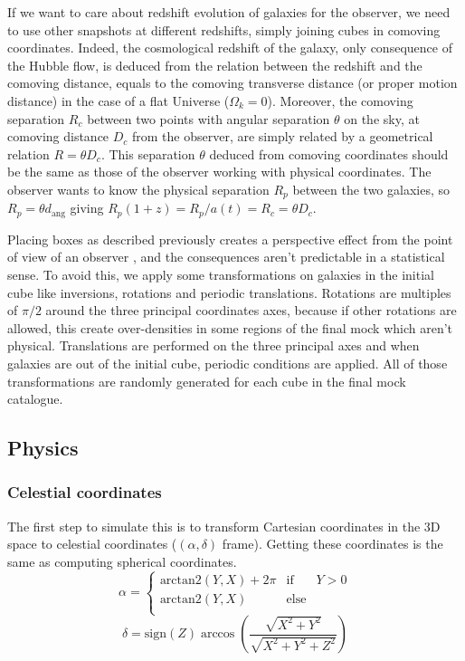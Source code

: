 If we want to care about redshift evolution of galaxies for the observer, we
need to use other snapshots at different redshifts, simply joining cubes in
comoving coordinates. Indeed, the cosmological redshift of the galaxy, only
consequence of the Hubble flow, is deduced from the relation between the
redshift and the comoving distance, equals to the comoving transverse distance
(or proper motion distance) in the case of a flat Universe ($\Omega_k=0$).
Moreover, the comoving separation $R_c$ between two points with angular
separation $\theta$ on the sky, at comoving distance $D_c$ from the observer,
are simply related by a geometrical relation $R=\theta D_c$. This separation
$\theta$ deduced from comoving coordinates should be the same as those of the
observer working with physical coordinates. The observer wants to know the
physical separation $R_p$ between the two galaxies, so $R_p=\theta
d_\mathrm{ang}$ giving $R_p \left(1+z\right)= R_p/a\left(t\right)=R_c=\theta
D_c$.

Placing boxes as described previously creates a perspective effect from the
point of view of an observer \citep{Blaizot+05}, and the consequences aren't
predictable in a statistical sense. To avoid this, we apply some
transformations on galaxies in the initial cube like inversions, rotations and
periodic translations. Rotations are multiples of $\pi/2$ around the three
principal coordinates axes, because if other rotations are allowed, this create
over-densities in some regions of the final mock which aren't physical.
Translations are performed on the three principal axes and when galaxies are
out of the initial cube, periodic conditions are applied. All of those
transformations are randomly generated for each cube in the final mock
catalogue.

\subsection{Physics}

\subsubsection{Celestial coordinates}

The first step to simulate this is to transform Cartesian coordinates in the
3D space to celestial coordinates ($(\alpha,\delta)$ frame). Getting these
coordinates is the same as computing spherical coordinates.
%
\begin{equation}
    \alpha=\left\{ \begin{array}{lcr}
     \mbox{arctan2} \left(Y, X\right)+2\pi & \mbox{if} & Y>0 \\
     \mbox{arctan2} \left(Y, X\right) & \mbox{else} & \\
    \end{array}\right.\nonumber%
\end{equation}
%
\begin{equation}
    \delta=\mbox{sign} \left(Z\right)
    \arccos\left(\frac{\sqrt{X^2+Y^2}}{\sqrt{X^2+Y^2+Z^2}}\right)
\end{equation}

